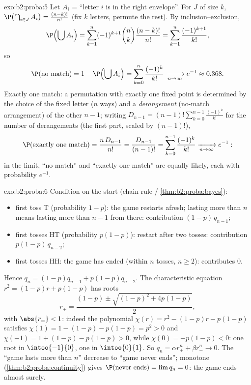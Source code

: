 \begin{solution}{exo:b2:proba:5}
Let $A_i$ = ``letter $i$ is in the right envelope''. For $J$ of
size $k$, $\P\bigl(\bigcap_{i\in J}A_i\bigr) =
\frac{(n-k)!}{n!}$ (fix $k$ letters, permute the rest). By
inclusion--exclusion,
\[
\P\Bigl(\bigcup A_i\Bigr)
= \sum_{k=1}^n (-1)^{k+1}\binom nk \frac{(n-k)!}{n!}
= \sum_{k=1}^n \frac{(-1)^{k+1}}{k!} ,
\]
so
\[
\P(\text{no match})
= 1 - \P\Bigl(\bigcup A_i\Bigr)
= \sum_{k=0}^{n}\frac{(-1)^k}{k!}
\xrightarrow[n\to\infty]{} e^{-1} \approx 0.368 .
\]
Exactly one match: a permutation with exactly one fixed point is
determined by the choice of the fixed letter ($n$ ways) and a
\emph{derangement} (no-match arrangement) of the other $n - 1$;
writing $D_{n-1} = (n-1)!\sum_{k=0}^{n-1}\frac{(-1)^k}{k!}$ for
the number of derangements (the first part, scaled by
$(n-1)!$),
\[
\P(\text{exactly one match})
= \frac{n\,D_{n-1}}{n!}
= \frac{D_{n-1}}{(n-1)!}
= \sum_{k=0}^{n-1}\frac{(-1)^k}{k!}
\xrightarrow[n\to\infty]{} e^{-1} :
\]
in the limit, ``no match'' and ``exactly one match'' are equally
likely, each with probability $e^{-1}$.
\end{solution}

\begin{solution}{exo:b2:proba:6}
Condition on the start (chain rule /
\cref{thm:b2:proba:bayes}):
\begin{itemize}
\item first toss T (probability $1 - p$): the game restarts
afresh; lasting more than $n$ means lasting more than $n - 1$ from
there: contribution $(1-p)\,q_{n-1}$;
\item first tosses HT (probability $p(1-p)$): restart after two
tosses: contribution $p(1-p)\,q_{n-2}$;
\item first tosses HH: the game has ended (within $n$ tosses, $n
\geq 2$): contributes $0$.
\end{itemize}
Hence $q_n = (1-p)q_{n-1} + p(1-p)q_{n-2}$. The characteristic
equation $r^2 = (1-p)r + p(1-p)$ has roots
\[
r_\pm = \frac{(1-p) \pm \sqrt{(1-p)^2 + 4p(1-p)}}{2},
\]
with $\abs{r_\pm} < 1$: indeed the polynomial $\chi(r) = r^2 -
(1-p)r - p(1-p)$ satisfies $\chi(1) = 1 - (1-p) - p(1-p) = p^2 >
0$ and $\chi(-1) = 1 + (1-p) - p(1-p) > 0$, while $\chi(0) =
-p(1-p) < 0$: one root in $\intoo{-1}{0}$, one in $\intoo{0}{1}$.
So $q_n = \alpha r_+^n + \beta r_-^n \to 0$. The  ``game
lasts more than $n$'' decrease to ``game never ends''; monotone
 (\cref{thm:b2:proba:continuity}) gives
$\P(\text{never ends}) = \lim q_n = 0$: the game ends almost
surely.
\end{solution}


